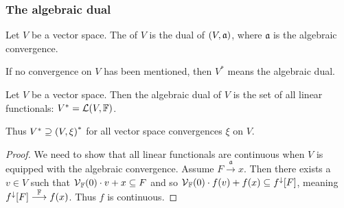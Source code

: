 \subsubsection{The algebraic dual}
\begin{definition}
Let $V$ be a vector space. The  of $V$ is the dual of $\left( V,\mathfrak{a} \right)$, where $\mathfrak{a}$ is the algebraic convergence.

If no convergence on $V$ has been mentioned, then $V^*$ means the algebraic dual.
\end{definition}

\begin{proposition} \label{algebraicDual}
Let $V$ be a vector space. Then the algebraic dual of $V$ is the set of all linear functionals: $V^* = \operatorname{\mathcal{L}}(V,\mathbb{F})$.

Thus $V^* \supseteq \left( V,\xi \right)^*$ for all vector space convergences $\xi$ on $V$.
\end{proposition}
\begin{proof}
We need to show that all linear functionals are continuous when $V$ is equipped with the algebraic convergence. Assume $F\overset{\mathfrak{a}}{\longrightarrow} x$. Then there exists a $v\in V$ such that $\operatorname{\mathcal{V}}_{\mathbb{F}}(0)\cdot v+x \subseteq F$ and so $\operatorname{\mathcal{V}}_{\mathbb{F}}(0)\cdot f(v)+f(x) \subseteq f^\downarrow[F]$, meaning $f^\downarrow[F] \overset{\mathbb{F}}{\longrightarrow} f(x)$. Thus $f$ is continuous.
\end{proof}


